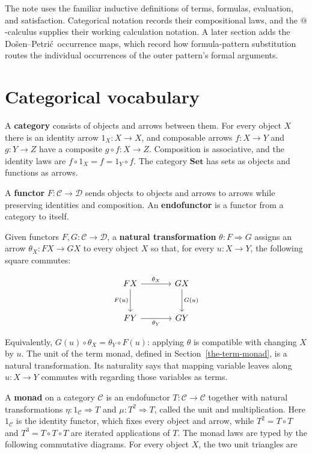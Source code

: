 \documentclass[11pt]{article}
\makeatletter
\newcommand{\atsign}{\mathord{@}}
\newcommand{\DP}{Do\v{s}en--Petri\'{c}}
\makeatother
\begin{document}
The note uses the familiar inductive definitions of terms, formulas,
evaluation, and satisfaction. Categorical notation records their compositional
laws, and the $\atsign$-calculus supplies their working calculation notation.
A later section adds the \DP\ occurrence maps, which record how
formula-pattern substitution routes the individual occurrences of the outer
pattern's formal arguments.

\section{Categorical vocabulary}\label{categorical-vocabulary}

A \textbf{category} consists of objects and arrows between them. For every
object \(X\) there is an identity arrow \(1_X:X\to X\), and composable arrows
\(f:X\to Y\) and \(g:Y\to Z\) have a composite
\(g\circ f:X\to Z\). Composition is associative, and the identity laws are
\(f\circ1_X=f=1_Y\circ f\). The category \(\mathbf{Set}\) has sets as objects
and functions as arrows.

A \textbf{functor} \(F:\mathcal C\to\mathcal D\) sends objects to
objects and arrows to arrows while preserving identities and
composition. An \textbf{endofunctor} is a functor from a category to
itself.

Given functors \(F,G:\mathcal C\to\mathcal D\), a \textbf{natural
transformation} \(\theta:F\Rightarrow G\) assigns an arrow
\(\theta_X:FX\to GX\) to every object \(X\) so that, for every
\(u:X\to Y\), the following square commutes:

\[
\begin{tikzcd}[row sep=large,column sep=large]
F X \arrow[r,"\theta_X"] \arrow[d,"F(u)"'] &
G X \arrow[d,"G(u)"] \\
F Y \arrow[r,"\theta_Y"'] &
G Y
\end{tikzcd}
\]

Equivalently, \(G(u)\circ\theta_X=\theta_Y\circ F(u)\): applying
\(\theta\) is compatible with changing \(X\) by \(u\). The unit of the term
monad, defined in Section~\ref{the-term-monad}, is a natural transformation.
Its naturality says that mapping variable leaves along \(u:X\to Y\) commutes
with regarding those variables as terms.

A \textbf{monad} on a category \(\mathcal C\) is an endofunctor
\(T:\mathcal C\to\mathcal C\) together with natural transformations
\(\eta:1_{\mathcal C}\Rightarrow T\) and \(\mu:T^2\Rightarrow T\), called
the unit and multiplication. Here \(1_{\mathcal C}\) is the identity functor,
which fixes every object and arrow, while \(T^2=T\circ T\) and
\(T^3=T\circ T\circ T\) are iterated applications of \(T\). The monad laws
are typed by the following commutative diagrams. For every object \(X\), the
two unit triangles are
\end{document}
